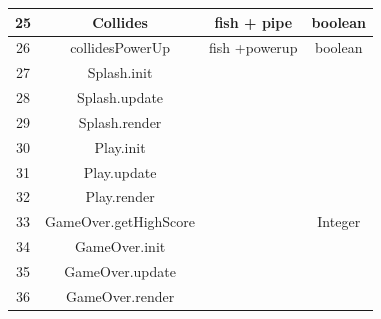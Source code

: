\documentclass[11pt, oneside]{article}   	%
\begin{document}
\begin{table}[H]
\begin{center}
\begin{tabular}{|c|c|c|c|}
25 & Collides & fish + pipe & boolean\\
\hline
26 & collidesPowerUp & fish +powerup & boolean\\
\hline
27 & Splash.init &  & \\
\hline
28 & Splash.update &  & \\
\hline
29 & Splash.render & & \\
\hline
30 & Play.init & & \\
\hline
31 & Play.update  &  & \\
\hline
32 & Play.render &  & \\
\hline
33 & GameOver.getHighScore &  & Integer\\
\hline
34 & GameOver.init &  & \\
\hline
35 & GameOver.update &  & \\
\hline
36 & GameOver.render &  & \\
\hline



\end{tabular}
\end{center}
\label{default}
\end{table}%
\end{document}
